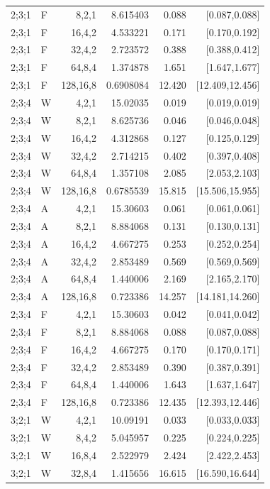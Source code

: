 {\begin{longtable}{@{}llrrrr@{}}
2;3;1 & F & 8,2,1 & 8.615403 & 0.088 & [0.087,0.088] \\
2;3;1 & F & 16,4,2 & 4.533221 & 0.171 & [0.170,0.192] \\
2;3;1 & F & 32,4,2 & 2.723572 & 0.388 & [0.388,0.412] \\
2;3;1 & F & 64,8,4 & 1.374878 & 1.651 & [1.647,1.677] \\
2;3;1 & F & 128,16,8 & 0.6908084 & 12.420 & [12.409,12.456] \\
2;3;4 & W & 4,2,1 & 15.02035 & 0.019 & [0.019,0.019] \\
2;3;4 & W & 8,2,1 & 8.625736 & 0.046 & [0.046,0.048] \\
2;3;4 & W & 16,4,2 & 4.312868 & 0.127 & [0.125,0.129] \\
2;3;4 & W & 32,4,2 & 2.714215 & 0.402 & [0.397,0.408] \\
2;3;4 & W & 64,8,4 & 1.357108 & 2.085 & [2.053,2.103] \\
2;3;4 & W & 128,16,8 & 0.6785539 & 15.815 & [15.506,15.955] \\
2;3;4 & A & 4,2,1 & 15.30603 & 0.061 & [0.061,0.061] \\
2;3;4 & A & 8,2,1 & 8.884068 & 0.131 & [0.130,0.131] \\
2;3;4 & A & 16,4,2 & 4.667275 & 0.253 & [0.252,0.254] \\
2;3;4 & A & 32,4,2 & 2.853489 & 0.569 & [0.569,0.569] \\
2;3;4 & A & 64,8,4 & 1.440006 & 2.169 & [2.165,2.170] \\
2;3;4 & A & 128,16,8 & 0.723386 & 14.257 & [14.181,14.260] \\
2;3;4 & F & 4,2,1 & 15.30603 & 0.042 & [0.041,0.042] \\
2;3;4 & F & 8,2,1 & 8.884068 & 0.088 & [0.087,0.088] \\
2;3;4 & F & 16,4,2 & 4.667275 & 0.170 & [0.170,0.171] \\
2;3;4 & F & 32,4,2 & 2.853489 & 0.390 & [0.387,0.391] \\
2;3;4 & F & 64,8,4 & 1.440006 & 1.643 & [1.637,1.647] \\
2;3;4 & F & 128,16,8 & 0.723386 & 12.435 & [12.393,12.446] \\
3;2;1 & W & 4,2,1 & 10.09191 & 0.033 & [0.033,0.033] \\
3;2;1 & W & 8,4,2 & 5.045957 & 0.225 & [0.224,0.225] \\
3;2;1 & W & 16,8,4 & 2.522979 & 2.424 & [2.422,2.453] \\
3;2;1 & W & 32,8,4 & 1.415656 & 16.615 & [16.590,16.644] \\

\end{longtable}}

